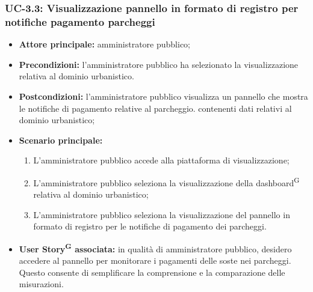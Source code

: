 \documentclass[8pt]{article}
\newcommand{\glossterm}[1]{#1\textsuperscript{G}} %
\begin{document}
\subsubsection*{UC-3.3: Visualizzazione pannello in formato di registro per notifiche pagamento parcheggi}
\begin{itemize}
    \item \textbf{Attore principale:} amministratore pubblico;
    \item \textbf{Precondizioni:} l'amministratore pubblico ha selezionato la visualizzazione
        relativa al dominio urbanistico.
    \item \textbf{Postcondizioni:} l'amministratore pubblico visualizza un pannello che mostra le notifiche di pagamento relative al parcheggio.
        contenenti dati relativi al dominio urbanistico;
    \item \textbf{Scenario principale:} 
    \begin{enumerate}
    \item L'amministratore pubblico accede alla piattaforma di visualizzazione;
    \item L'amministratore pubblico seleziona la visualizzazione della \glossterm{dashboard} relativa al dominio urbanistico;
    \item L'amministratore pubblico seleziona la visualizzazione del pannello in formato di registro per le notifiche di pagamento dei parcheggi.
    \end{enumerate}
    \item \textbf{\glossterm{User Story} associata:} in qualità di amministratore pubblico, desidero accedere al pannello per monitorare i pagamenti delle soste nei parcheggi. Questo consente di semplificare la comprensione e la comparazione delle misurazioni.
\end{itemize}
\end{document}
